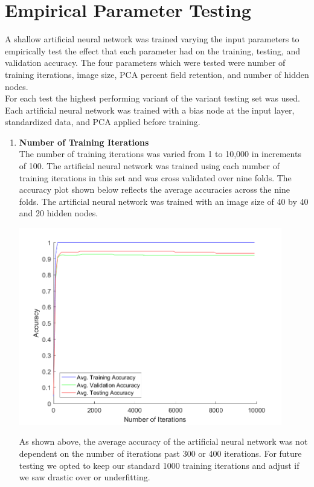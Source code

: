 \documentclass[12pt]{article}
\begin{document}
\section{Empirical Parameter Testing}
A shallow artificial neural network was trained varying the input parameters to empirically test the effect that each parameter had on the training, testing, and validation accuracy. The four parameters which were tested were number of training iterations, image size, PCA percent field retention, and number of hidden nodes.\\
For each test the highest performing variant of the variant testing set was used. Each artificial neural network was trained with a bias node at the input layer, standardized data, and PCA applied before training.\\
\begin{enumerate}
  \item \textbf{Number of Training Iterations}\\
  The number of training iterations was varied from 1 to 10,000 in increments of 100. The artificial neural network was trained using each number of training iterations in this set and was cross validated over nine folds. The accuracy plot shown below reflects the average accuracies across the nine folds. The artificial neural network was trained with an image size of 40 by 40 and 20 hidden nodes.\\
  \begin{center}
    \includegraphics[width=115mm]{./figs/num_iterations_empirical.png}
    \label{fig:img_iters}
  \end{center}
  As shown above, the average accuracy of the artificial neural network was not dependent on the number of iterations past 300 or 400 iterations. For future testing we opted to keep our standard 1000 training iterations and adjust if we saw drastic over or underfitting.\\


\end{enumerate}
\end{document}
